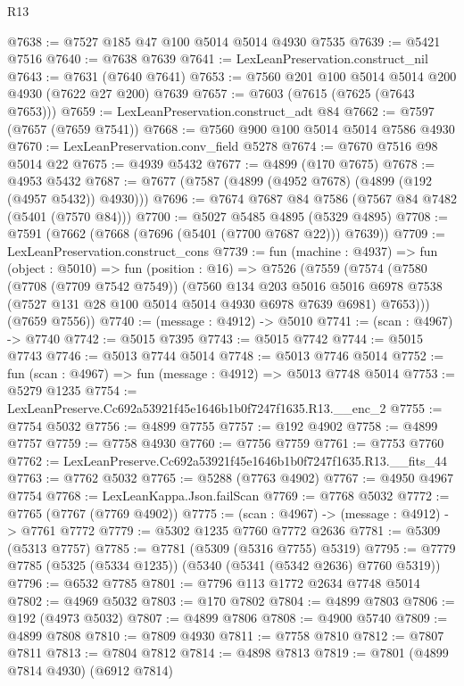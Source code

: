 \begin{lexlean}{R13}
\begin{coremodule}
@7638 := @7527 @185 @47 @100 @5014 @5014 @4930 @7535
@7639 := @5421 @7516
@7640 := @7638 @7639
@7641 := LexLeanPreservation.construct_nil
@7643 := @7631 (@7640 @7641)
@7653 := @7560 @201 @100 @5014 @5014 @200 @4930 (@7622 @27 @200) @7639
@7657 := @7603 (@7615 (@7625 (@7643 @7653)))
@7659 := LexLeanPreservation.construct_adt @84
@7662 := @7597 (@7657 (@7659 @7541))
@7668 := @7560 @900 @100 @5014 @5014 @7586 @4930
@7670 := LexLeanPreservation.conv_field @5278
@7674 := @7670 @7516 @98 @5014 @22
@7675 := @4939 @5432
@7677 := @4899 (@170 @7675)
@7678 := @4953 @5432
@7687 := @7677 (@7587 (@4899 (@4952 @7678) (@4899 (@192 (@4957 @5432)) @4930)))
@7696 := @7674 @7687 @84 @7586 (@7567 @84 @7482 (@5401 (@7570 @84)))
@7700 := @5027 @5485 @4895 (@5329 @4895)
@7708 := @7591 (@7662 (@7668 (@7696 (@5401 (@7700 @7687 @22))) @7639))
@7709 := LexLeanPreservation.construct_cons
@7739 := fun (machine : @4937) =>
  fun (object : @5010) =>
  fun (position : @16) =>
  @7526
    (@7559
      (@7574
        (@7580
          (@7708 (@7709 @7542 @7549))
          (@7560
            @134
            @203
            @5016
            @5016
            @6978
            @7538
            (@7527 @131 @28 @100 @5014 @5014 @4930 @6978 @7639 @6981)
            @7653)))
      (@7659 @7556))
@7740 := (message : @4912) -> @5010
@7741 := (scan : @4967) -> @7740
@7742 := @5015 @7395
@7743 := @5015 @7742
@7744 := @5015 @7743
@7746 := @5013 @7744 @5014
@7748 := @5013 @7746 @5014
@7752 := fun (scan : @4967) => fun (message : @4912) => @5013 @7748 @5014
@7753 := @5279 @1235
@7754 := LexLeanPreserve.Cc692a53921f45e1646b1b0f7247f1635.R13.__enc_2
@7755 := @7754 @5032
@7756 := @4899 @7755
@7757 := @192 @4902
@7758 := @4899 @7757
@7759 := @7758 @4930
@7760 := @7756 @7759
@7761 := @7753 @7760
@7762 := LexLeanPreserve.Cc692a53921f45e1646b1b0f7247f1635.R13.__fits_44
@7763 := @7762 @5032
@7765 := @5288 (@7763 @4902)
@7767 := @4950 @4967 @7754
@7768 := LexLeanKappa.Json.failScan
@7769 := @7768 @5032
@7772 := @7765 (@7767 (@7769 @4902))
@7775 := (scan : @4967) -> (message : @4912) -> @7761 @7772
@7779 := @5302 @1235 @7760 @7772 @2636
@7781 := @5309 (@5313 @7757)
@7785 := @7781 (@5309 (@5316 @7755) @5319)
@7795 := @7779 @7785 (@5325 (@5334 @1235)) (@5340 (@5341 (@5342 @2636) @7760 @5319))
@7796 := @6532 @7785
@7801 := @7796 @113 @1772 @2634 @7748 @5014
@7802 := @4969 @5032
@7803 := @170 @7802
@7804 := @4899 @7803
@7806 := @192 (@4973 @5032)
@7807 := @4899 @7806
@7808 := @4900 @5740
@7809 := @4899 @7808
@7810 := @7809 @4930
@7811 := @7758 @7810
@7812 := @7807 @7811
@7813 := @7804 @7812
@7814 := @4898 @7813
@7819 := @7801 (@4899 @7814 @4930) (@6912 @7814)

\end{coremodule}
\end{lexlean}
